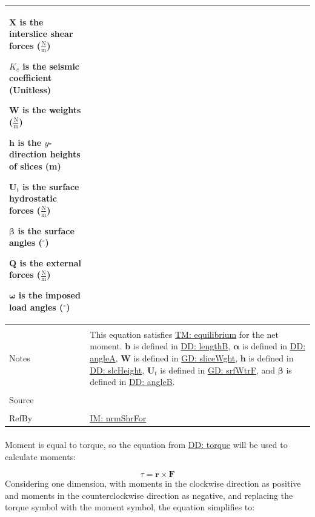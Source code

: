 \documentclass[12pt]{article}
\begin{document}
\begin{minipage}{\textwidth}
\begin{tabular}{>{\raggedright}p{}>{\raggedright\arraybackslash}p{}}
\begin{symbDescription}
              \item{$\mathbf{X}$ is the interslice shear forces ($\frac{\text{N}}{\text{m}}$)}
              \item{${K_{c}}$ is the seismic coefficient (Unitless)}
              \item{$\mathbf{W}$ is the weights ($\frac{\text{N}}{\text{m}}$)}
              \item{$\mathbf{h}$ is the $y$-direction heights of slices (m)}
              \item{${\mathbf{U}_{t}}$ is the surface hydrostatic forces ($\frac{\text{N}}{\text{m}}$)}
              \item{$\mathbf{β}$ is the surface angles (${}^{\circ}$)}
              \item{$\mathbf{Q}$ is the external forces ($\frac{\text{N}}{\text{m}}$)}
              \item{$\mathbf{ω}$ is the imposed load angles (${}^{\circ}$)}
              \end{symbDescription}
\\ \midrule \\
Notes & This equation satisfies \hyperref[TM:equilibrium]{TM: equilibrium} for the net moment. $\mathbf{b}$ is defined in \hyperref[DD:lengthB]{DD: lengthB}, $\mathbf{α}$ is defined in \hyperref[DD:angleA]{DD: angleA}, $\mathbf{W}$ is defined in \hyperref[GD:sliceWght]{GD: sliceWght}, $\mathbf{h}$ is defined in \hyperref[DD:slcHeight]{DD: slcHeight}, ${\mathbf{U}_{t}}$ is defined in \hyperref[GD:srfWtrF]{GD: srfWtrF}, and $\mathbf{β}$ is defined in \hyperref[DD:angleB]{DD: angleB}.
        
\\ \midrule \\
Source & \cite{chen2005}
         
\\ \midrule \\
RefBy & \hyperref[IM:nrmShrFor]{IM: nrmShrFor}
        
\\ \bottomrule
\end{tabular}
\end{minipage}
\paragraph{}
\label{GD:momentEqlDeriv}
Moment is equal to torque, so the equation from \hyperref[DD:torque]{DD: torque} will be used to calculate moments:

\begin{displaymath}
τ=\mathbf{r}\times\mathbf{F}
\end{displaymath}
Considering one dimension, with moments in the clockwise direction as positive and moments in the counterclockwise direction as negative, and replacing the torque symbol with the moment symbol, the equation simplifies to:
\end{document}

